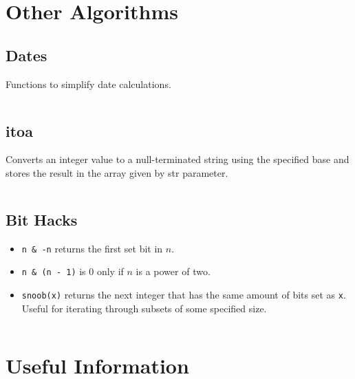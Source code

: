 \documentclass[9pt,a4paper,twocolumn,landscape,oneside]{amsart}
\newcommand{\code}[1]{\inputminted{cpp}{_Code/#1}}
\begin{document}
\section{Other Algorithms}
    \subsection{Dates}
        Functions to simplify date calculations.
        \code{Other/dates.cpp}

    \subsection{itoa}
        Converts an integer value to a null-terminated string using the
        specified base and stores the result in the array given by str
        parameter.
        \code{Other/itoa.cpp}

    \subsection{Bit Hacks}
        \begin{itemize}
            \item \texttt{n \&{} -n} returns the first set bit in $n$.
            \item \texttt{n \&{} (n - 1)} is $0$ only if $n$ is a power of two.
            \item \texttt{snoob(x)} returns the next integer that has the
                same amount of bits set as \texttt{x}. Useful for iterating
                through subsets of some specified size.
        \end{itemize}
        \code{Other/snoob.cpp}

\section{Useful Information}
\end{document}
